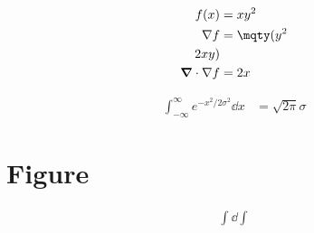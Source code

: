 \documentclass{article}
\begin{document}
\begin{align}
    f(x) & =xy^2\\
    \nabla f&=\mqty(y^2\\2xy)\\
    \boldsymbol{\nabla}\cdot\nabla f&=2x
\end{align}

\begin{align}
    \int_{-\infty}^\infty e^{-x^2/2\sigma^2}\dd{x}&=\sqrt{2\pi}\sigma
\end{align}


\section{Figure}

\begin{align}
    \int\dd{\int}
\end{align}
\end{document}

